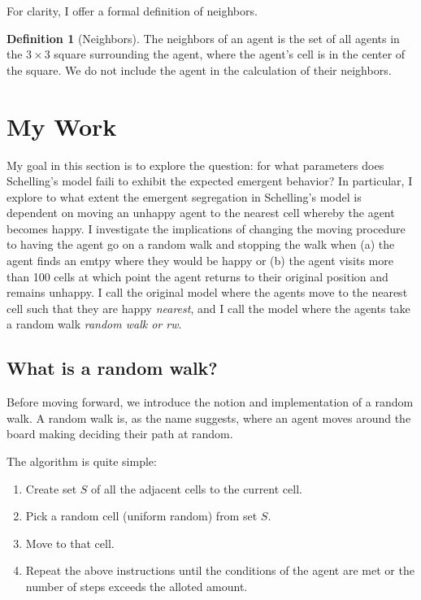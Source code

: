 \documentclass[11pt,twoside]{amsart}
\theoremstyle{theorem}
\theoremstyle{definition}
\newtheorem{definition}[theorem]{Definition}
\theoremstyle{remark}
\begin{document}
For clarity, I offer a formal definition of neighbors.
\begin{definition}[Neighbors]
    The neighbors of an agent is the set of all agents in the $3 \times 3$ square surrounding the agent, where the agent's cell is in the center of the square. 
    We do not include the agent in the calculation of their neighbors. 
\end{definition}

\section{My Work}
My goal in this section is to explore the question: for what parameters does Schelling's model faili to exhibit the expected emergent behavior?
In particular, I explore to what extent the emergent segregation in Schelling's model is dependent on moving an unhappy agent to the nearest cell whereby the agent becomes happy.
I investigate the implications of changing the moving procedure to having the agent go on a random walk and stopping the walk when (a) the agent finds an emtpy where they would be happy or (b) the agent visits more than 100 cells at which point the agent returns to their original position and remains unhappy.
I call the original model where the agents move to the nearest cell such that they are happy \emph{nearest}, and I call the model where the agents take a random walk \emph{random walk or rw}.

\subsection{What is a random walk?}
Before moving forward, we introduce the notion and implementation of a random walk.
A random walk is, as the name suggests, where an agent moves around the board making deciding their path at random. 

The algorithm is quite simple:
\begin{enumerate}
    \item Create set $S$ of all the adjacent cells to the current cell.
    \item Pick a random cell (uniform random) from set $S$.
    \item Move to that cell. 
    \item Repeat the above instructions until the conditions of the agent are met or the number of steps exceeds the alloted amount.
\end{enumerate}
\end{document}
